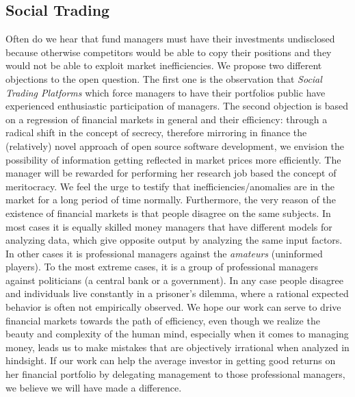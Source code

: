 \documentclass[9pt,oneside]{amsart}
\begin{document}
\begin{multicols}{2}
\section{Social Trading} \label{ch:create}
Often do we hear that fund managers must have their investments undisclosed because otherwise competitors would be able to copy their positions and they would not be able to exploit market inefficiencies. We propose two different objections to the open question. The first one is the observation that \textit{Social Trading Platforms} which force managers to have their portfolios public have experienced enthusiastic participation of managers. The second objection is based on a regression of financial markets in general and their efficiency: through a radical shift in the concept of secrecy, therefore mirroring in finance the (relatively) novel approach of open source software development, we envision the possibility of information getting reflected in market prices more efficiently. The manager will be rewarded for performing her research job based the concept of meritocracy. We feel the urge to testify that inefficiencies/anomalies are in the market for a long period of time normally. Furthermore, the very reason of the existence of financial markets is that people disagree on the same subjects. In most cases it is equally skilled money managers that have different models for analyzing data, which give opposite output by analyzing the same input factors. In other cases it is professional managers against the \textit{amateurs} (uninformed players). To the most extreme cases, it is a group of professional managers against politicians (a central bank or a government). In any case people disagree and individuals live constantly in a prisoner's dilemma, where a rational expected behavior is often not empirically observed.
We hope our work can serve to drive financial markets towards the path of efficiency, even though we realize the beauty and complexity of the human mind, especially when it comes to managing money, leads us to make mistakes that are objectively irrational when analyzed in hindsight.
If our work can help the average investor in getting good returns on her financial portfolio by delegating management to those professional managers, we believe we will have made a difference.


\end{multicols}
\end{document}
